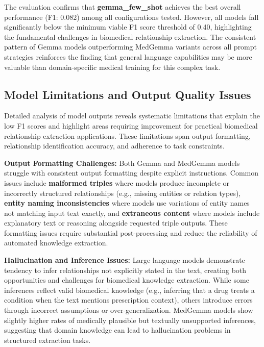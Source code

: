 The evaluation confirms that \textbf{gemma\_few\_shot} achieves the best overall performance (F1: 0.082) among all configurations tested. However, all models fall significantly below the minimum viable F1 score threshold of 0.40, highlighting the fundamental challenges in biomedical relationship extraction. The consistent pattern of Gemma models outperforming MedGemma variants across all prompt strategies reinforces the finding that general language capabilities may be more valuable than domain-specific medical training for this complex task.

\subsection{Model Limitations and Output Quality Issues}

Detailed analysis of model outputs reveals systematic limitations that explain the low F1 scores and highlight areas requiring improvement for practical biomedical relationship extraction applications. These limitations span output formatting, relationship identification accuracy, and adherence to task constraints.

\textbf{Output Formatting Challenges:} Both Gemma and MedGemma models struggle with consistent output formatting despite explicit instructions. Common issues include \textbf{malformed triples} where models produce incomplete or incorrectly structured relationships (e.g., missing entities or relation types), \textbf{entity naming inconsistencies} where models use variations of entity names not matching input text exactly, and \textbf{extraneous content} where models include explanatory text or reasoning alongside requested triple outputs. These formatting issues require substantial post-processing and reduce the reliability of automated knowledge extraction.

\textbf{Hallucination and Inference Issues:} Large language models demonstrate tendency to infer relationships not explicitly stated in the text, creating both opportunities and challenges for biomedical knowledge extraction. While some inferences reflect valid biomedical knowledge (e.g., inferring that a drug treats a condition when the text mentions prescription context), others introduce errors through incorrect assumptions or over-generalization. MedGemma models show slightly higher rates of medically plausible but textually unsupported inferences, suggesting that domain knowledge can lead to hallucination problems in structured extraction tasks.

